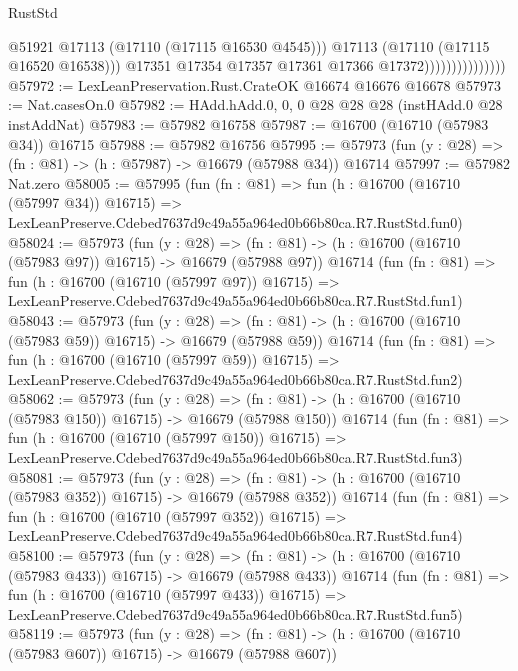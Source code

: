 \begin{lexlean}{RustStd}
\begin{coremodule}
                                      @51921
                                      @17113
                                      (@17110 (@17115 @16530 @4545)))
                                    @17113
                                    (@17110 (@17115 @16520 @16538)))
                                  @17351
                                  @17354
                                  @17357
                                  @17361
                                  @17366
                                  @17372)))))))))))))))
@57972 := LexLeanPreservation.Rust.CrateOK @16674 @16676 @16678
@57973 := Nat.casesOn.{0}
@57982 := HAdd.hAdd.{0, 0, 0} @28 @28 @28 (instHAdd.{0} @28 instAddNat)
@57983 := @57982 @16758
@57987 := @16700 (@16710 (@57983 @34)) @16715
@57988 := @57982 @16756
@57995 := @57973 (fun (y : @28) => (fn : @81) -> (h : @57987) -> @16679 (@57988 @34)) @16714
@57997 := @57982 Nat.zero
@58005 := @57995
    (fun (fn : @81) =>
    fun (h : @16700 (@16710 (@57997 @34)) @16715) =>
    LexLeanPreserve.Cdebed7637d9c49a55a964ed0b66b80ca.R7.RustStd.fun0)
@58024 := @57973
    (fun (y : @28) =>
    (fn : @81) -> (h : @16700 (@16710 (@57983 @97)) @16715) -> @16679 (@57988 @97))
    @16714
    (fun (fn : @81) =>
    fun (h : @16700 (@16710 (@57997 @97)) @16715) =>
    LexLeanPreserve.Cdebed7637d9c49a55a964ed0b66b80ca.R7.RustStd.fun1)
@58043 := @57973
    (fun (y : @28) =>
    (fn : @81) -> (h : @16700 (@16710 (@57983 @59)) @16715) -> @16679 (@57988 @59))
    @16714
    (fun (fn : @81) =>
    fun (h : @16700 (@16710 (@57997 @59)) @16715) =>
    LexLeanPreserve.Cdebed7637d9c49a55a964ed0b66b80ca.R7.RustStd.fun2)
@58062 := @57973
    (fun (y : @28) =>
    (fn : @81) -> (h : @16700 (@16710 (@57983 @150)) @16715) -> @16679 (@57988 @150))
    @16714
    (fun (fn : @81) =>
    fun (h : @16700 (@16710 (@57997 @150)) @16715) =>
    LexLeanPreserve.Cdebed7637d9c49a55a964ed0b66b80ca.R7.RustStd.fun3)
@58081 := @57973
    (fun (y : @28) =>
    (fn : @81) -> (h : @16700 (@16710 (@57983 @352)) @16715) -> @16679 (@57988 @352))
    @16714
    (fun (fn : @81) =>
    fun (h : @16700 (@16710 (@57997 @352)) @16715) =>
    LexLeanPreserve.Cdebed7637d9c49a55a964ed0b66b80ca.R7.RustStd.fun4)
@58100 := @57973
    (fun (y : @28) =>
    (fn : @81) -> (h : @16700 (@16710 (@57983 @433)) @16715) -> @16679 (@57988 @433))
    @16714
    (fun (fn : @81) =>
    fun (h : @16700 (@16710 (@57997 @433)) @16715) =>
    LexLeanPreserve.Cdebed7637d9c49a55a964ed0b66b80ca.R7.RustStd.fun5)
@58119 := @57973
    (fun (y : @28) =>
    (fn : @81) -> (h : @16700 (@16710 (@57983 @607)) @16715) -> @16679 (@57988 @607))

\end{coremodule}
\end{lexlean}
